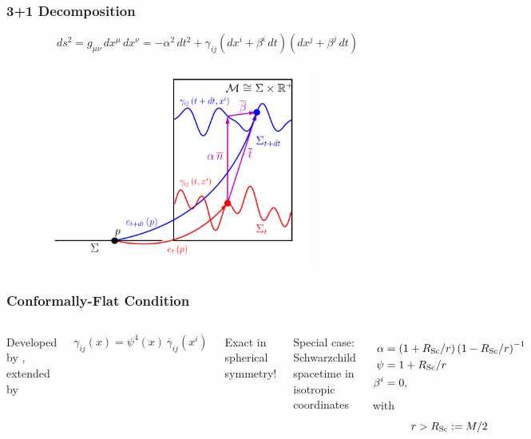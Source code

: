 \documentclass{beamer}
\begin{document}
\begin{frame}
\frametitle{3+1 Decomposition}

  \begin{equation*}
    ds^{2}
    =g_{\mu\nu}\,dx^{\mu}\,dx^{\nu}
    =-\alpha^{2}\,dt^{2}
     +\gamma_{ij}\left(dx^{i}+\beta^{i}\,dt\right)
                 \left(dx^{j}+\beta^{j}\,dt\right)
  \end{equation*}

  \vspace{-0.5em}

  \begin{figure}[htb!]
    \centering
    \includegraphics[width=0.8\textwidth]{fig.1p1.png}
  \end{figure}

\end{frame}

\begin{frame}
\frametitle{Conformally-Flat Condition}

  \begin{columns}[c]


      Developed by \citet{wmm1996}, extended by \citet{cc2009}

      \begin{equation*}
        \gamma_{ij}\left(x\right)
        =\psi^{4}\left(x\right)\,\overline{\gamma}_{ij}\left(x^{i}\right)
      \end{equation*}\vspace{1em}

      Exact in spherical symmetry!


      Special case: Schwarzchild spacetime in isotropic coordinates

      \begin{align*}
        \alpha&=\left(1+R_{\mathrm{Sc}}/r\right)\left(1-R_{\mathrm{Sc}}/r\right)^{-1} \\
        \psi&=1+R_{\mathrm{Sc}}/r \\
        \beta^{i}&=0,
      \end{align*}
      with
      \begin{equation*}
        r>R_{\mathrm{Sc}}:=M/2
      \end{equation*}

  \end{columns}

\end{frame}
\end{document}
